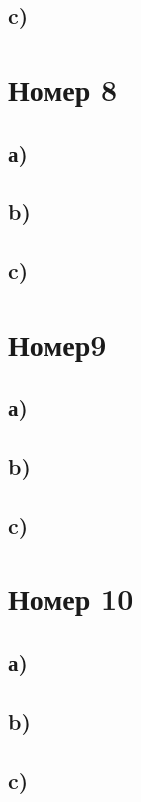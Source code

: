 \documentclass[a4paper,12pt]{article}
\begin{document}
\subsection*{c)}
\section*{Номер 8}
\subsection*{а)}
\subsection*{b)}
\subsection*{c)}
\section*{Номер9}
\subsection*{а)}
\subsection*{b)}
\subsection*{c)}
\section*{Номер 10}
\subsection*{а)}
\subsection*{b)}
\subsection*{c)}
\end{document}
